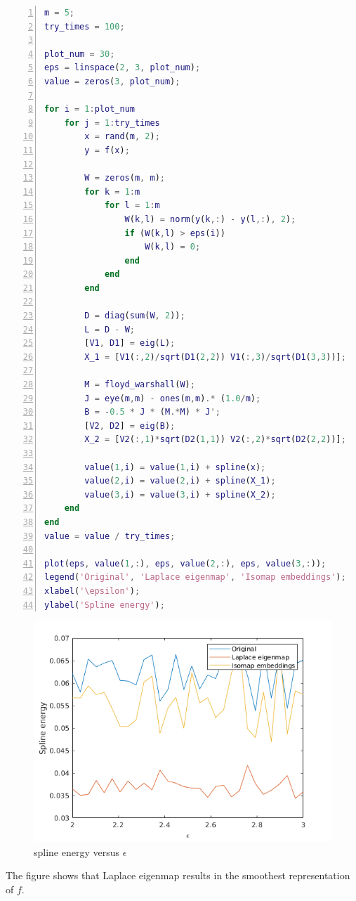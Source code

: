 \documentclass[a4paper, 11pt]{article}
\begin{document}
\begin{lstlisting}[language = Matlab, numbers=left,   
  numberstyle=\tiny,keywordstyle=\color{blue!70},  
  commentstyle=\color{red!50!green!50!blue!50},frame=shadowbox,  
  rulesepcolor=\color{red!20!green!20!blue!20},basicstyle=\ttfamily,
  tabsize=2]
m = 5;
try_times = 100;

plot_num = 30;
eps = linspace(2, 3, plot_num);
value = zeros(3, plot_num);

for i = 1:plot_num
	for j = 1:try_times
		x = rand(m, 2);
		y = f(x);

		W = zeros(m, m);
		for k = 1:m
			for l = 1:m
				W(k,l) = norm(y(k,:) - y(l,:), 2);
				if (W(k,l) > eps(i))
					W(k,l) = 0;
				end
			end
		end

		D = diag(sum(W, 2));
		L = D - W;
		[V1, D1] = eig(L);
		X_1 = [V1(:,2)/sqrt(D1(2,2)) V1(:,3)/sqrt(D1(3,3))];

		M = floyd_warshall(W);
		J = eye(m,m) - ones(m,m).* (1.0/m);
		B = -0.5 * J * (M.*M) * J';
		[V2, D2] = eig(B);
		X_2 = [V2(:,1)*sqrt(D2(1,1)) V2(:,2)*sqrt(D2(2,2))];

		value(1,i) = value(1,i) + spline(x);
		value(2,i) = value(2,i) + spline(X_1);
		value(3,i) = value(3,i) + spline(X_2);
	end
end
value = value / try_times;

plot(eps, value(1,:), eps, value(2,:), eps, value(3,:));
legend('Original', 'Laplace eigenmap', 'Isomap embeddings');
xlabel('\epsilon');
ylabel('Spline energy');
\end{lstlisting}
\begin{figure}[htbp]
\centering
	\includegraphics[scale=0.6]{figure/p3.png}
	\caption{spline energy versus $\epsilon$}
	\label{fig1}
\end{figure}

The figure shows that Laplace eigenmap results in the smoothest representation of $f$.
\end{document}
